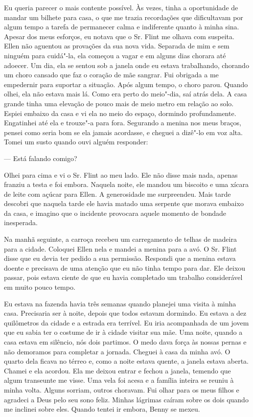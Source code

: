 Eu queria parecer o mais contente
possível. Às vezes, tinha a oportunidade de mandar um bilhete para casa,
o que me trazia recordações que dificultavam por algum tempo a tarefa de
permanecer calma e indiferente quanto à minha sina. Apesar dos meus
esforços, eu notava que o Sr. Flint me olhava com suspeita. Ellen não
aguentou as provações da sua nova vida. Separada de mim e sem ninguém
para cuidá"-la, ela começou a vagar e em alguns dias chorara até adoecer.
Um dia, ela se sentou sob a janela onde eu estava trabalhando, chorando
um choro cansado que faz o coração de mãe sangrar. Fui obrigada a me
empedernir para suportar a situação. Após algum tempo, o choro parou.
Quando olhei, ela não estava mais lá. Como era perto do meio"-dia, saí
atrás dela. A casa grande tinha uma elevação de pouco mais de meio metro
em relação ao solo. Espiei embaixo da casa e vi ela no meio do espaço,
dormindo profundamente. Engatinhei até ela e trouxe"-a para fora.
Segurando a menina nos meus braços, pensei como seria bom se ela jamais
acordasse, e cheguei a dizê"-lo em voz alta. Tomei um susto quando ouvi
alguém responder:

--- Está falando comigo?

Olhei para cima e vi o Sr. Flint ao meu lado. Ele não disse mais nada,
apenas franziu a testa e foi embora. Naquela noite, ele mandou um
biscoito e uma xícara de leite com açúcar para Ellen. A generosidade me
surpreendeu. Mais tarde descobri que naquela tarde ele havia matado uma
serpente que morava embaixo da casa, e imagino que o incidente provocara
aquele momento de bondade inesperada.

Na manhã seguinte, a carroça recebeu um
carregamento de telhas de madeira para a cidade. Coloquei Ellen nela e
mandei a menina para a avó. O Sr. Flint disse que eu devia ter pedido a
sua permissão. Respondi que a menina estava doente e precisava de uma
atenção que eu não tinha tempo para dar. Ele deixou passar, pois estava
ciente de que eu havia completado um trabalho considerável em muito
pouco tempo.

Eu estava na fazenda havia três semanas
quando planejei uma visita à minha casa. Precisaria ser à noite, depois
que todos estavam dormindo. Eu estava a dez quilômetros da cidade e a
estrada era terrível. Eu iria acompanhada de um jovem que eu sabia ter o
costume de ir à cidade visitar sua mãe. Uma noite, quando a casa estava
em silêncio, nós dois partimos. O medo dava força às nossas pernas e não
demoramos para completar a jornada. Cheguei à casa da minha avó. O
quarto dela ficava no térreo e, como a noite estava quente, a janela
estava aberta. Chamei e ela acordou. Ela me deixou entrar e fechou a
janela, temendo que algum transeunte me visse. Uma vela foi acesa e a
família inteira se reuniu à minha volta. Alguns sorriam, outros
choravam. Fui olhar para os meus filhos e agradeci a Deus pelo seu sono
feliz. Minhas lágrimas caíram sobre os dois quando me inclinei sobre
eles. Quando tentei ir embora, Benny se mexeu.

